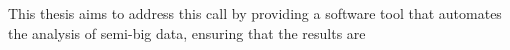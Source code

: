 This thesis aims to address this call by providing a software tool
that automates the analysis of semi-big data, ensuring that the results are





















